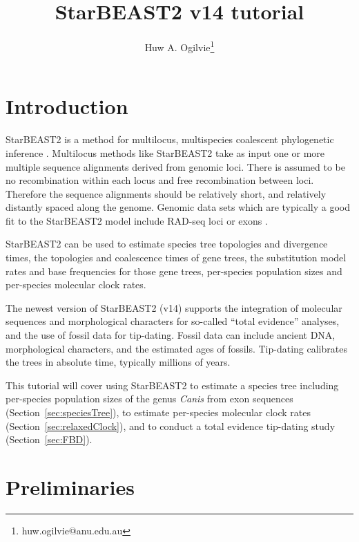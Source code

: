 \documentclass[12pt]{article}
\begin{document}
\title{StarBEAST2 v14 tutorial}
\author[1,2]{Huw A. Ogilvie\thanks{huw.ogilvie@anu.edu.au}}

\maketitle

\clearpage

\section{Introduction}
\label{sec:intro}

StarBEAST2 is a method for multilocus, multispecies coalescent phylogenetic
inference \citep{Ogilvie2017}. Multilocus methods like StarBEAST2 take as
input one or more multiple sequence alignments derived from genomic loci.
There is assumed to be no recombination within each locus and free
recombination between loci. Therefore the sequence alignments should be
relatively short, and relatively distantly spaced along the genome. Genomic
data sets which are typically a good fit to the StarBEAST2 model include
RAD-seq loci \citep{Ogilvie2016} or exons \citep{Scornavacca2017}.

StarBEAST2 can be used to estimate species tree topologies and divergence
times, the topologies and coalescence times of gene trees, the substitution
model rates and base frequencies for those gene trees, per-species population
sizes and per-species molecular clock rates.

The newest version of StarBEAST2 (v14) supports the integration of molecular
sequences and morphological characters for so-called ``total evidence'' analyses,
and the use of fossil data for tip-dating. Fossil data can include ancient
DNA, morphological characters, and the estimated ages of fossils. Tip-dating calibrates
the trees in absolute time, typically millions of years.

This tutorial will cover using StarBEAST2 to estimate a species tree including
per-species population sizes of the genus \textit{Canis} from exon sequences
(Section~\ref{sec:speciesTree}),
to estimate per-species molecular clock rates
(Section~\ref{sec:relaxedClock}),
and to conduct a total evidence tip-dating study
(Section~\ref{sec:FBD}).

\section{Preliminaries}
\label{sec:prelim}
\end{document}
